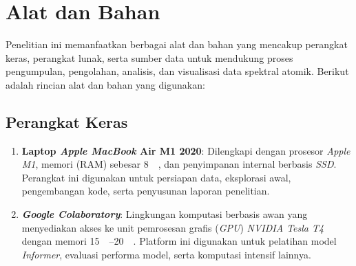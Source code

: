 \section{Alat dan Bahan}
Penelitian ini memanfaatkan berbagai alat dan bahan yang mencakup perangkat keras, perangkat lunak, serta sumber data untuk mendukung proses pengumpulan, pengolahan, analisis, dan visualisasi data spektral atomik. Berikut adalah rincian alat dan bahan yang digunakan:

\subsection{Perangkat Keras}
\begin{enumerate}
  \item \textbf{Laptop \textit{Apple MacBook} Air M1 2020}: Dilengkapi dengan prosesor \textit{Apple M1}, memori (RAM) sebesar \SI{8}{\giga\byte}, dan penyimpanan internal berbasis \textit{SSD}. Perangkat ini digunakan untuk persiapan data, eksplorasi awal, pengembangan kode, serta penyusunan laporan penelitian.
  \item \textbf{\textit{Google Colaboratory}}: Lingkungan komputasi berbasis awan yang menyediakan akses ke unit pemrosesan grafis (\textit{GPU}) \textit{NVIDIA Tesla T4} dengan memori \SIrange{15}{20}{\giga\byte}. Platform ini digunakan untuk pelatihan model \textit{Informer}, evaluasi performa model, serta komputasi intensif lainnya.
\end{enumerate}

